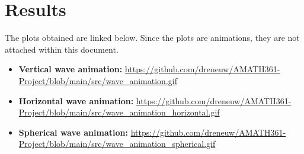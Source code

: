 \section{Results}
The plots obtained are linked below. Since the plots are animations, they are not attached within this document.
\begin{itemize}
    \item \textbf{Vertical wave animation:} \url{https://github.com/dreneuw/AMATH361-Project/blob/main/src/wave_animation.gif}
\item \textbf{Horizontal wave animation:} \url{https://github.com/dreneuw/AMATH361-Project/blob/main/src/wave_animation_horizontal.gif}
\item \textbf{Spherical wave animation:} \url{https://github.com/dreneuw/AMATH361-Project/blob/main/src/wave_animation_spherical.gif}
\end{itemize}